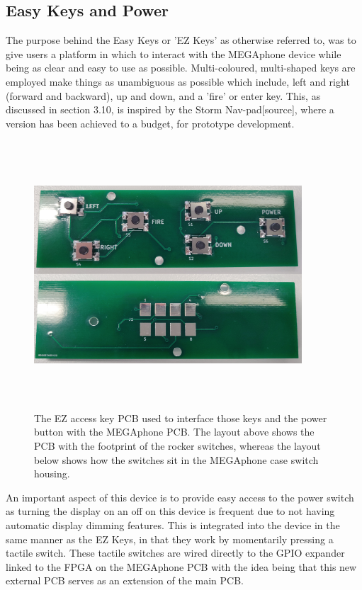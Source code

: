 \subsection{Easy Keys and Power}

The purpose behind the Easy Keys or 'EZ Keys' as otherwise referred to, was to give users a platform in which to interact with the MEGAphone device while being as clear and easy to use as possible.
Multi-coloured, multi-shaped keys are employed make things as unambiguous as possible which include, left and right (forward and backward), up and down, and a 'fire' or enter key.
This, as discussed in section 3.10, is inspired by the Storm Nav-pad[source], where a version has been achieved to a budget, for prototype development. %

\begin{figure} [h]
    \centering
    \includegraphics[width=10cm,height=10cm,keepaspectratio]{Figures/easykeypcb.png}
    \caption{The EZ access key PCB used to interface those keys and the power button with the MEGAphone PCB. The layout above shows the PCB with the footprint of the rocker switches, whereas the layout below shows how the switches sit in the MEGAphone case switch housing.}
    \label{fig:EZkeys}
\end{figure}

An important aspect of this device is to provide easy access to the power switch as turning the display on an off on this device is frequent due to not having automatic display dimming features.
This is integrated into the device in the same manner as the EZ Keys, in that they work by momentarily pressing a tactile switch.
These tactile switches are wired directly to the GPIO expander linked to the FPGA on the MEGAphone PCB with the idea being that this new external PCB serves as an extension of the main PCB.

